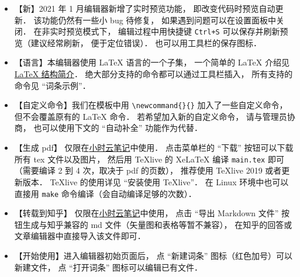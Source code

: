 \begin{itemize}
\item 【新】2021 年 1 月编辑器新增了实时预览功能， 即改变代码时预览自动更新． 该功能仍然有一些小 bug 待修复， 如果遇到问题可以在设置面板中关闭． 在非实时预览模式下， 编辑过程中用快捷键 \verb|Ctrl+S| 可以保存并刷新预览（建议经常刷新， 便于定位错误）． 也可以用工具栏的保存图标．
\item 【语言】本编辑器使用 LaTeX 语言的一个子集， 一个简单的 LaTeX 介绍见 \href{https://wuli.wiki/online/latxIn.html}{LaTeX 结构简介}． 绝大部分支持的命令都可以通过工具栏插入， 所有支持的命令见 “词条示例”．
\item 【自定义命令】我们在模板中用 \verb|\newcommand{}{}| 加入了一些自定义命令， 但不会覆盖原有的 LaTeX 命令． 若希望加入新的自定义命令， 请与管理员协商， 也可以使用下文的 “自动补全” 功能作为代替．
\item 【生成 pdf】 仅限在\href{http://wuli.wiki/note/}{小时云笔记}中使用． 点击菜单栏的 “下载” 按钮可以下载所有 tex 文件以及图片， 然后用 TeXlive 的 XeLaTeX 编译 \verb|main.tex| 即可（需要编译 2 到 4 次，取决于 pdf 的页数）， 推荐使用 TeXlive 2019 或者更新版本． TeXlive 的使用详见 “安装使用 TeXlive”． 在 Linux 环境中也可以直接用 \verb|make| 命令编译（会自动编译足够的次数）．
\item 【转载到知乎】 仅限在\href{http://wuli.wiki/note/}{小时云笔记}中使用， 点击 “导出 Markdown 文件” 按钮生成与知乎兼容的 md 文件（矢量图和表格等暂不兼容）， 在知乎的回答或文章编辑器中直接导入该文件即可．
\item 【开始使用】进入编辑器初始页面后， 点 “新建词条” 图标（红色加号）可以新建文件， 点 “打开词条” 图标可以编辑已有文件．

\end{itemize}

